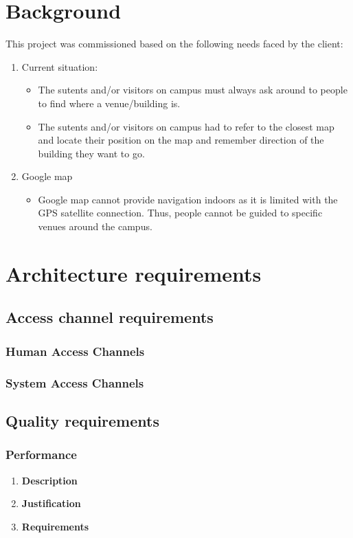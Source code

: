 \documentclass[a4paper,10pt]{article}
\begin{document}
\section{Background}
This project was commissioned based on the following needs faced by the client:
\begin{enumerate}
\item Current situation:
	\begin{itemize}
	\item The sutents and/or visitors on campus must always ask around to people to find where a venue/building is.
	\item The sutents and/or visitors on campus had to refer to the closest map and locate their position on the map and remember direction of the building they want to go.
	\end{itemize}
\item Google map
	\begin{itemize}
	\item  Google map cannot provide navigation indoors as it is limited with the GPS satellite connection. Thus, people cannot be guided to specific venues around the campus.
	\end{itemize}
\end{enumerate}
\section{Architecture requirements}
\subsection{Access channel requirements}
\subsubsection{Human Access Channels}

\subsubsection{System Access Channels}

\subsection{Quality requirements}
\subsubsection{Performance}
\begin{enumerate}
\item \textbf{Description} \\

\item \textbf{Justification} \\
\item \textbf{Requirements}
\end{enumerate}
\end{document}
